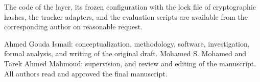 \documentclass[pdflatex,sn-mathphys-num]{sn-jnl}
\begin{document}
The code of the layer, its frozen configuration with the lock file of cryptographic hashes, the
tracker adapters, and the evaluation scripts are available from the corresponding author on
reasonable request.

Ahmed Gouda Ismail: conceptualization, methodology, software, investigation, formal analysis, and
writing of the original draft. Mohamed S. Mohamed and Tarek Ahmed Mahmoud: supervision, and
review and editing of the manuscript. All authors read and approved the final manuscript.


\end{document}
